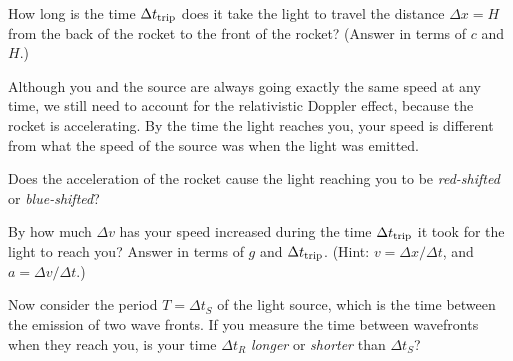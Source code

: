 \begin{enumerate}[labparts]
\item How long is the time $\Delta t_{\rm trip}$ does it take the light to travel the distance $\Delta x = H$ from the back of the rocket to the front of the rocket?  (Answer in terms of $c$ and $H$.)
\answerspace{0.5in}

Although you and the source are always going exactly the same speed at any time, we still need to account for the relativistic Doppler effect, because the rocket is accelerating.  By the time the light reaches you, your speed is different from what the speed of the source was when the light was emitted.

\begin{minipage}{0.6\textwidth}

\item Does the acceleration of the rocket cause the light reaching you to be \textit{red-shifted} or \textit{blue-shifted}?
\answerspace{0.5in}

\item By how much $\Delta v$ has your speed increased during the time $\Delta t_{\rm trip}$ it took for the light to reach you? Answer in terms of $g$ and $\Delta t_{\rm trip}$.  (Hint: $v = \Delta x / \Delta t$, and $a = \Delta v / \Delta t$.)
\answerspace{0.5in}


\item Now consider the period $T = \Delta t_S$ of the light source, which is the time between the emission of two wave fronts.  If you measure the time between wavefronts when they reach you, is your time $\Delta t_R$ \textit{longer} or \textit{shorter} than $\Delta t_S$?
\answerspace{0.5in}



\end{minipage}
\end{enumerate}
